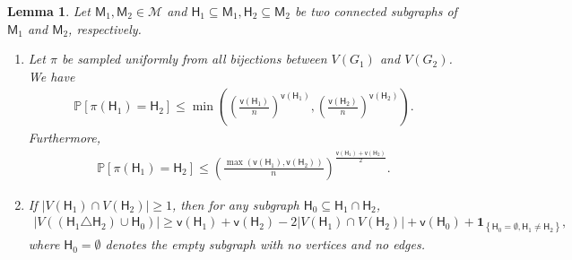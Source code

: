 \documentclass[letterpaper,11pt]{article}
\newtheorem{lemma}{Lemma}
\theoremstyle{definition}
\newcommand{\maM}{\mathcal{M}}
\newcommand{\prob}[1]{ \mathbb{P}\left[ #1 \right] }
\newcommand{\vn}{\mathsf{{v}}}
\newcommand{\pth}[1]{\left( #1 \right)}
\newcommand{\sfH}{{\mathsf{H}}}
\newcommand{\sfM}{{\mathsf{M}}}
\newcommand{\indc}[1]{{\mathbf{1}_{\left\{{#1}\right\}}}}
\begin{document}
\begin{lemma}\label{lem:aux-lem}
    Let $\sfM_1,\sfM_2\in \maM$ and $\sfH_1\subseteq \sfM_1,\sfH_2\subseteq \sfM_2$ be two connected subgraphs of $\sfM_1$ and $\sfM_2$, respectively.
    \begin{enumerate} 
        \item Let $\pi$ be sampled uniformly from all bijections between $V(G_1)$ and $V(G_2)$. We have 
    \begin{align*}
        \prob{\pi(\sfH_1) = \sfH_2}\le \min\pth{\pth{\frac{\vn(\sfH_1)}{n}}^{\vn(\sfH_1)},\pth{\frac{\vn(\sfH_2)}{n}}^{\vn(\sfH_2)}}.
    \end{align*}
    Furthermore, \begin{align*}
        \prob{\pi(\sfH_1)=\sfH_2}\le \pth{\frac{\max\pth{\vn(\sfH_1),\vn(\sfH_2)}}{n}}^{\frac{\vn(\sfH_1)+\vn(\sfH_2)}{2}}.
    \end{align*}
    \item If $|V(\sfH_1)\cap V(\sfH_2)|\ge 1$, then for any subgraph $\sfH_0\subseteq \sfH_1\cap \sfH_2$, \begin{align*}
        |V((\sfH_1\triangle \sfH_2)\cup \sfH_0)|\ge \vn(\sfH_1)+\vn(\sfH_2)-2|V(\sfH_1)\cap V(\sfH_2)|+\vn(\sfH_0)+\indc{\sfH_0=\emptyset, \sfH_1\neq \sfH_2},
    \end{align*}
    where $\sfH_0 =\emptyset$ denotes the empty subgraph with no vertices and no edges.
    \end{enumerate}
\end{lemma}
\end{document}
